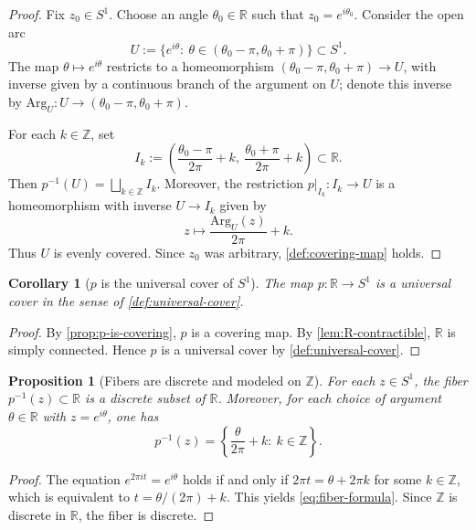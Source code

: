 \documentclass[11pt,a4paper]{article}
\newtheorem{proposition}[theorem]{Proposition}
\newtheorem{corollary}[theorem]{Corollary}
\theoremstyle{definition}
\theoremstyle{remark}
\begin{document}
\begin{proof}
Fix \(z_{0}\in S^{1}\). Choose an angle \(\theta_{0}\in \mathbb{R}\) such that \(z_{0}=e^{i\theta_{0}}\). Consider the open arc
\[
U:=\{e^{i\theta}:\ \theta\in (\theta_{0}-\pi,\theta_{0}+\pi)\}\subset S^{1}.
\]
The map \(\theta\mapsto e^{i\theta}\) restricts to a homeomorphism \((\theta_{0}-\pi,\theta_{0}+\pi)\to U\), with inverse given by a continuous branch of the argument on \(U\); denote this inverse by \(\mathrm{Arg}_{U}:U\to (\theta_{0}-\pi,\theta_{0}+\pi)\).

For each \(k\in \mathbb{Z}\), set
\[
I_{k}:=\left(\frac{\theta_{0}-\pi}{2\pi}+k,\ \frac{\theta_{0}+\pi}{2\pi}+k\right)\subset \mathbb{R}.
\]
Then \(p^{-1}(U)=\bigsqcup_{k\in \mathbb{Z}} I_{k}\). Moreover, the restriction \(p|_{I_{k}}:I_{k}\to U\) is a homeomorphism with inverse \(U\to I_{k}\) given by
\[
z\longmapsto \frac{\mathrm{Arg}_{U}(z)}{2\pi}+k.
\]
Thus \(U\) is evenly covered. Since \(z_{0}\) was arbitrary, \cref{def:covering-map} holds.
\end{proof}

\begin{corollary}[\(p\) is the universal cover of \(S^1\)]
\label{cor:universal-cover}
The map \(p:\mathbb{R}\to S^{1}\) is a universal cover in the sense of \cref{def:universal-cover}.
\end{corollary}

\begin{proof}
By \cref{prop:p-is-covering}, \(p\) is a covering map. By \cref{lem:R-contractible}, \(\mathbb{R}\) is simply connected. Hence \(p\) is a universal cover by \cref{def:universal-cover}.
\end{proof}

\begin{proposition}[Fibers are discrete and modeled on \(\mathbb{Z}\)]
\label{prop:fibers}
For each \(z\in S^{1}\), the fiber \(p^{-1}(z)\subset \mathbb{R}\) is a discrete subset of \(\mathbb{R}\). Moreover, for each choice of argument \(\theta\in \mathbb{R}\) with \(z=e^{i\theta}\), one has
\begin{equation}
\label{eq:fiber-formula}
p^{-1}(z)=\left\{\frac{\theta}{2\pi}+k:\ k\in \mathbb{Z}\right\}.
\end{equation}
\end{proposition}

\begin{proof}
The equation \(e^{2\pi i t}=e^{i\theta}\) holds if and only if \(2\pi t=\theta+2\pi k\) for some \(k\in\mathbb{Z}\), which is equivalent to \(t=\theta/(2\pi)+k\). This yields \cref{eq:fiber-formula}. Since \(\mathbb{Z}\) is discrete in \(\mathbb{R}\), the fiber is discrete.
\end{proof}
\end{document}
